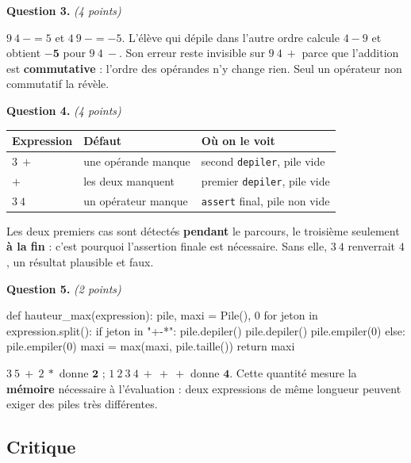 \medskip
\textbf{Question 3.} \emph{(4 points)}

$9\ 4\ - = 5$ et $4\ 9\ - = -5$. L'élève qui dépile dans l'autre ordre calcule
$4 - 9$ et obtient $\mathbf{-5}$ pour $9\ 4\ -$. Son erreur reste invisible sur
$9\ 4\ +$ parce que l'addition est \textbf{commutative} : l'ordre des opérandes
n'y change rien. Seul un opérateur non commutatif la révèle.

\medskip
\textbf{Question 4.} \emph{(4 points)}

\begin{center}
\begin{tabular}{|l|l|l|}
\hline
\textbf{Expression} & \textbf{Défaut} & \textbf{Où on le voit} \\
\hline
$3\ +$ & une opérande manque & second \texttt{depiler}, pile vide \\
\hline
$+$ & les deux manquent & premier \texttt{depiler}, pile vide \\
\hline
$3\ 4$ & un opérateur manque & \texttt{assert} final, pile non vide \\
\hline
\end{tabular}
\end{center}

Les deux premiers cas sont détectés \textbf{pendant} le parcours, le troisième
seulement \textbf{à la fin} : c'est pourquoi l'assertion finale est
nécessaire. Sans elle, $3\ 4$ renverrait $4$, un résultat plausible et faux.

\medskip
\textbf{Question 5.} \emph{(2 points)}

\begin{python}
def hauteur_max(expression):
    pile, maxi = Pile(), 0
    for jeton in expression.split():
        if jeton in "+-*":
            pile.depiler()
            pile.depiler()
            pile.empiler(0)
        else:
            pile.empiler(0)
        maxi = max(maxi, pile.taille())
    return maxi
\end{python}

$3\ 5\ +\ 2\ *$ donne $\mathbf{2}$ ; $1\ 2\ 3\ 4\ +\ +\ +$ donne $\mathbf{4}$.
Cette quantité mesure la \textbf{mémoire} nécessaire à l'évaluation : deux
expressions de même longueur peuvent exiger des piles très différentes.

\subsection*{Critique}

